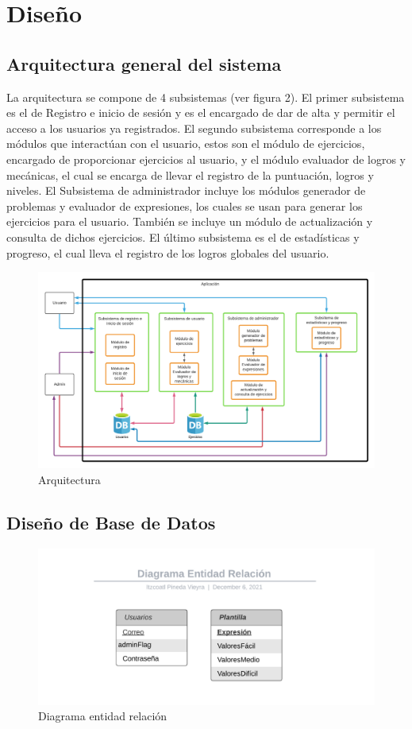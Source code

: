 \documentclass{article}
\begin{document}
\pagebreak
\section{Diseño}
\subsection{Arquitectura general del sistema}%
La arquitectura se compone de 4 subsistemas (ver figura 2).  El primer subsistema es el de Registro e inicio de sesión y es el encargado de dar de alta y permitir el acceso a los usuarios ya registrados. El segundo subsistema corresponde a los módulos que interactúan con el usuario, estos son el módulo de ejercicios, encargado de proporcionar ejercicios al usuario, y el módulo evaluador de logros y mecánicas, el cual se encarga de llevar el registro de la puntuación, logros y niveles. El Subsistema de administrador incluye los módulos generador de problemas y evaluador de expresiones, los cuales se usan para generar los ejercicios para el usuario. También se incluye un módulo de actualización y consulta de dichos ejercicios. El último subsistema es el de estadísticas y progreso, el cual lleva el registro de los logros globales del usuario.  
\begin{figure}[H]
    \centering
    \includegraphics[scale=0.65]{imgs/Arquitectura}
    \caption{Arquitectura}
\end{figure}

\subsection{Diseño de Base de Datos}%
\begin{figure}[H]
    \centering
    \includegraphics[scale=0.9]{imgs/BSD}
    \caption{Diagrama entidad relación}
\end{figure}
\end{document}
